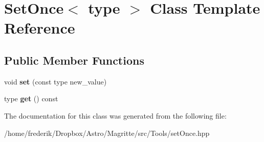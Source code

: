 \hypertarget{classSetOnce}{}\section{Set\+Once$<$ type $>$ Class Template Reference}
\label{classSetOnce}
\subsection*{Public Member Functions}
\begin{DoxyCompactItemize}
\item 
\mbox{\label{classSetOnce_a6d16cfd2048dc5562783a2525da9072a}} 
void {\bfseries set} (const type new\+\_\+value)
\item 
\mbox{\label{classSetOnce_af0a9cdc5121e83c5d1752251d94c4584}} 
type {\bfseries get} () const
\end{DoxyCompactItemize}


The documentation for this class was generated from the following file\+:\begin{DoxyCompactItemize}
\item 
/home/frederik/\+Dropbox/\+Astro/\+Magritte/src/\+Tools/set\+Once.\+hpp\end{DoxyCompactItemize}
